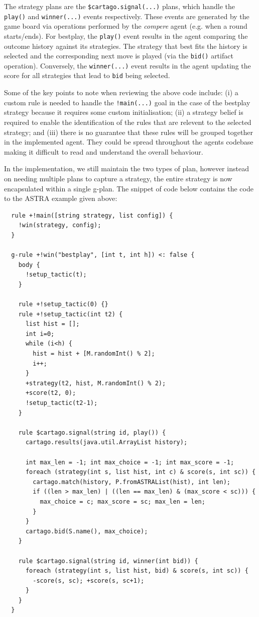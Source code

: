 The strategy plans are the \verb|$cartago.signal(...)| plans, which handle the \verb|play()| 
and \verb|winner(...)| events respectively. These events are generated by the game board via operations
performed by the \emph{compere} agent (e.g. when a round starts/ends). For bestplay, the 
\verb|play()| event results in the agent comparing the outcome history against its strategies. The 
strategy that best fits the history is selected and the corresponding next move is played (via 
the \verb|bid()| artifact operation). Conversely, the \verb|winner(...)| event results in the 
agent updating the score for all strategies that lead to \verb|bid| being selected.

Some of the key points to note when reviewing the above code include: (i) a custom rule is needed 
to handle the \verb|!main(...)| goal in the case of the bestplay strategy because it requires
some custom initialisation; (ii) a strategy belief is required to enable the identification of the
rules that are relevent to the selected strategy; and (iii) there is no guarantee that these
rules will be grouped together in the implemented agent. They could be spread throughout the
agents codebase making it difficult to read and understand the overall behaviour.

In the {\aser} implementation, we still maintain the two types of plan, however instead on needing
multiple plans to capture a strategy, the entire strategy is now encapsulated within a single
g-plan. The snippet of code below contains the {\aser} code to the ASTRA example given above:


{\small
\begin{verbatim}
  rule +!main([string strategy, list config]) {
    !win(strategy, config);
  }
  
  g-rule +!win("bestplay", [int t, int h]) <: false {
    body {
      !setup_tactic(t);
    }

    rule +!setup_tactic(0) {}
    rule +!setup_tactic(int t2) {
      list hist = [];
      int i=0;
      while (i<h) {
        hist = hist + [M.randomInt() % 2];
        i++;
      }
      +strategy(t2, hist, M.randomInt() % 2);
      +score(t2, 0);
      !setup_tactic(t2-1);
    }

    rule $cartago.signal(string id, play()) {
      cartago.results(java.util.ArrayList history);
			
      int max_len = -1; int max_choice = -1; int max_score = -1;
      foreach (strategy(int s, list hist, int c) & score(s, int sc)) {
        cartago.match(history, P.fromASTRAList(hist), int len);
        if ((len > max_len) | ((len == max_len) & (max_score < sc))) {
          max_choice = c; max_score = sc; max_len = len;
        }
      }		
      cartago.bid(S.name(), max_choice);
    }
		
    rule $cartago.signal(string id, winner(int bid)) {
      foreach (strategy(int s, list hist, bid) & score(s, int sc)) {
        -score(s, sc); +score(s, sc+1);
      }
    }
  }
\end{verbatim}}

